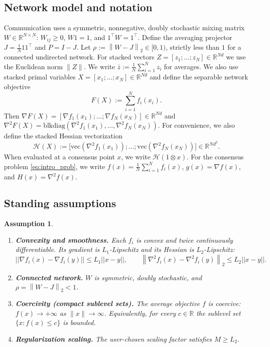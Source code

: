 \documentclass[11pt,a4paper]{article}
\def\one{1}%
\def\J{J}%
\def\Pmat{P}%
\def\norm#1{||#1||}%
\newtheorem{assumption}[theorem]{Assumption}
\newcommand{\R}{\mathbb{R}}
\newcommand{\one}{\mathbf{1}}
\newcommand{\norm}[1]{\left\|#1\right\|}
\newcommand{\normtwo}[1]{\left\|#1\right\|_2}
\newcommand{\J}{\left(\frac{1}{N}\one\one^\top\right)}
\newcommand{\Pmat}{I-\J}
\begin{document}
	\subsection{Network model and notation}
	Communication uses a symmetric, nonnegative, doubly stochastic mixing matrix $W\in\R^{N\times N}$:
	$W_{ij}\ge0$, $W\one=\one$, and $\one^\top W=\one^\top$.
	Define the averaging projector $\J=\frac{1}{N}\one\one^\top$ and $\Pmat=I-\J$.
	Let $\rho := \normtwo{W-\J}\in[0,1)$, strictly less than $1$ for a connected undirected network.
	For stacked vectors $Z=[z_1;\dots;z_N]\in\R^{Nd}$ we use the Euclidean norm $\|Z\|$.
	We write $\bar z:=\frac1N\sum_{i=1}^N z_i$ for averages.
	We also use stacked primal variables $X=[x_1;\dots;x_N]\in\R^{Nd}$ and define the separable network objective
	\[
	F(X):=\sum_{i=1}^N f_i(x_i).
	\]
	Then $\nabla F(X)=[\nabla f_1(x_1);\dots;\nabla f_N(x_N)]\in\R^{Nd}$ and
	$\nabla^2 F(X)=\mathrm{blkdiag}(\nabla^2 f_1(x_1),\dots,\nabla^2 f_N(x_N))$.
	For convenience, we also define the stacked Hessian vectorization
	\[
	\mathcal H(X):=\big[\mathrm{vec}(\nabla^2 f_1(x_1));\dots;\mathrm{vec}(\nabla^2 f_N(x_N))\big]\in\R^{Nd^2}.
	\]
	When evaluated at a consensus point $x$, we write $\mathcal H(\one\otimes x)$.
	For the consensus problem \eqref{eq:intro_prob}, we write
	$f(x)=\frac1N\sum_{i=1}^N f_i(x)$, $g(x)=\nabla f(x)$, and $H(x)=\nabla^2 f(x)$.
	
	\subsection{Standing assumptions}
	\begin{assumption}\label{ass:standing}
		\begin{enumerate}\itemsep2pt
			\item \textbf{Convexity and smoothness.}
			Each $f_i$ is convex and twice continuously differentiable.
			Its gradient is $L_1$-Lipschitz and its Hessian is $L_2$-Lipschitz:
			\[
			\norm{\nabla f_i(x)-\nabla f_i(y)}\le L_1\norm{x-y},
			\qquad
			\normtwo{\nabla^2 f_i(x)-\nabla^2 f_i(y)}\le L_2\norm{x-y}.
			\]
			\item \textbf{Connected network.} $W$ is symmetric, doubly stochastic, and $\rho=\normtwo{W-\J}<1$.
			\item \textbf{Coercivity (compact sublevel sets).}
			The average objective $f$ is coercive: $f(x)\to+\infty$ as $\|x\|\to\infty$.
			Equivalently, for every $c\in\R$ the sublevel set $\{x:f(x)\le c\}$ is bounded.
			\item \textbf{Regularization scaling.} The user-chosen scaling factor satisfies $M\ge L_2$.
		\end{enumerate}
	\end{assumption}
	
\end{document}
